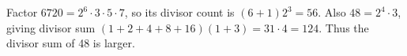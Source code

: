 Factor $6720=2^6\cdot 3\cdot 5\cdot 7$, so its divisor count is $(6+1)2^3=\boxed{56}$. Also $48=2^4\cdot 3$, giving divisor sum $(1+2+4+8+16)(1+3)=31\cdot 4=\boxed{124}$. Thus the divisor sum of 48 is larger.

